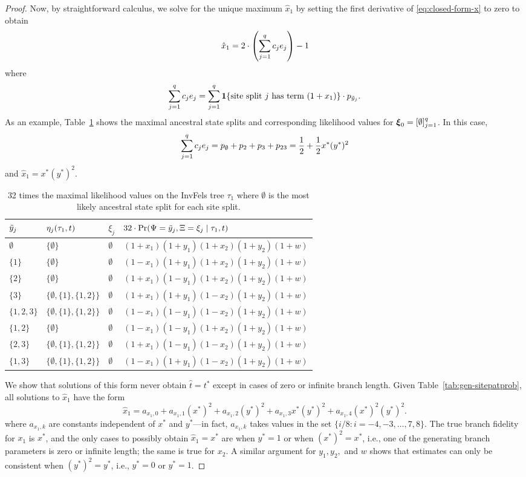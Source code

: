 \begin{proof}
Now, by straightforward calculus, we solve for the unique maximum $\hat{x}_1$ by setting the first derivative of \eqref{eq:closed-form-x} to zero to obtain
\[
\hat{x}_1 = 2\cdot\left(\sum_{j=1}^q c_je_j\right) - 1
\]
where
\[
\sum_{j=1}^q c_je_j = \sum_{j=1}^q \mathbf{1}\{\mbox{site split $j$ has term $(1+x_1)$}\} \cdot p_{\tilde{y}_j}.
\]
As an example, Table~\ref{tab:likelihoods-restricted} shows the maximal ancestral state splits and corresponding likelihood values for $\boldsymbol\xi_0 = [\emptyset]_{j=1}^q$.
In this case,
\[
\sum_{j=1}^q c_je_j = p_{\emptyset} + p_2 + p_3 + p_{23} = \frac{1}{2} + \frac{1}{2}x^*(y^*)^2
\]
and $\hat{x}_1 = x^*(y^*)^2$.

\begin{table}
\centering
\begin{tabular}{|lll|l|}
\hline
$\tilde{y}_j$ & $\eta_j(\tau_1, t)$ & $\xi_j$ & $32\cdot\Pr(\Psi=\tilde{y}_j,\Xi=\xi_j \mid \tau_1,t)$\\
\hline
$\emptyset$&$\{\emptyset\}$&$\emptyset$&$(1+x_1)(1+y_1)(1+x_2)(1+y_2)(1+w)$\\
$\{1\}$    &$\{\emptyset\}$&$\emptyset$&$(1-x_1)(1+y_1)(1+x_2)(1+y_2)(1+w)$\\
$\{2\}$    &$\{\emptyset\}$&$\emptyset$&$(1+x_1)(1-y_1)(1+x_2)(1+y_2)(1+w)$\\
$\{3\}$    &$\{\emptyset,\{1\},\{1,2\}\}$&$\emptyset$&$(1+x_1)(1+y_1)(1-x_2)(1+y_2)(1+w)$\\
$\{1,2,3\}$&$\{\emptyset,\{1\},\{1,2\}\}$&$\emptyset$&$(1-x_1)(1-y_1)(1-x_2)(1+y_2)(1+w)$\\
$\{1,2\}$  &$\{\emptyset\}$&$\emptyset$&$(1-x_1)(1-y_1)(1+x_2)(1+y_2)(1+w)$\\
$\{2,3\}$  &$\{\emptyset,\{1\},\{1,2\}\}$&$\emptyset$&$(1+x_1)(1-y_1)(1-x_2)(1+y_2)(1+w)$\\
$\{1,3\}$  &$\{\emptyset,\{1\},\{1,2\}\}$&$\emptyset$&$(1-x_1)(1+y_1)(1-x_2)(1+y_2)(1+w)$\\
\hline
\end{tabular}
\caption{
32 times the maximal likelihood values on the InvFels tree $\tau_1$ where $\emptyset$ is the most likely ancestral state split for each site split.
}
\label{tab:likelihoods-restricted}
\end{table}

We show that solutions of this form never obtain $\hat{t} = t^*$ except in cases of zero or infinite branch length.
Given Table~\ref{tab:gen-sitepatprob}, all solutions to $\hat{x}_1$ have the form
\[
\hat{x}_1 = a_{x_1,0} + a_{x_1,1}(x^*)^2 + a_{x_1,2}(y^*)^2 + a_{x_1,3} x^*(y^*)^2 + a_{x_1,4}(x^*)^2(y^*)^2.
\]
where $a_{x_1,k}$ are constants independent of $x^*$ and $y^*$---in fact, $a_{x_1,k}$ takes values in the set $\{i/8 : i=-4,-3,\ldots,7,8\}$.
The true branch fidelity for $x_1$ is $x^*$, and the only cases to possibly obtain $\hat{x}_1=x^*$ are when $y^*=1$ or when $(x^*)^2=x^*$, i.e., one of the generating branch parameters is zero or infinite length; the same is true for $x_2$.
A similar argument for $y_1,y_2,$ and $w$ shows that estimates can only be consistent when $(y^*)^2=y^*$, i.e., $y^*=0$ or $y^*=1$.
\end{proof}

